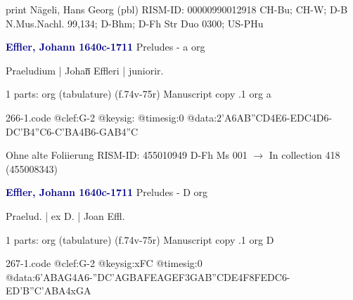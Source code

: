 \documentclass[twocolumn]{book}
\begin{document}
\newline print
\newline Nägeli, Hans Georg  (pbl)
\newline RISM-ID: 00000990012918
\newline CH-Bu; CH-W; D-B  N.Mus.Nachl. 99,134; D-Bhm; D-Fh  Str Duo 0300; US-PHu
\newline \par \vspace{7pt} \textcolor{darkblue}{\textbf{Effler, Johann  1640c-1711}}
\newline Preludes - a
\newline org
\newline \begin{itshape}[f.74v, at left:] Praeludium | Johan̅ Effleri | juniorir.\end{itshape} 
\newline \textcolor{darkblue}{}  1 parts: org (tabulature)  (f.74v-75r)
\newline Manuscript copy
.1  org  a  
\begin{filecontents*}{266-1.code}
@clef:G-2
@keysig:
@timesig:0
@data:2'A{6AB''CD}4E6-{EDC}4D6-{DC'B}4''C6-{C'BA}4B6-{GAB}4''C
\end{filecontents*}
\newline
%

\newline Ohne alte Foliierung
\newline RISM-ID: 455010949
\newline D-Fh  Ms 001
\newline $\rightarrow$ In collection 418 (455008343)
      
\newline \par \vspace{7pt} \textcolor{darkblue}{\textbf{Effler, Johann  1640c-1711}}
\newline Preludes - D
\newline org
\newline \begin{itshape}[f.75r, at left:] Praelud. | ex D. | Joan Effl.\end{itshape} 
\newline \textcolor{darkblue}{}  1 parts: org (tabulature)  (f.74v-75r)
\newline Manuscript copy
.1  org  D  
\begin{filecontents*}{267-1.code}
@clef:G-2
@keysig:xFC
@timesig:0
@data:{6'ABAG}4A6-{''DC'A}{GBAF}{EAGE}{F3GA}{B''CDE}4F{8FEDC}6-{ED'B}{''C'ABA}4xGA
\end{filecontents*}
\newline
%
\end{document}
